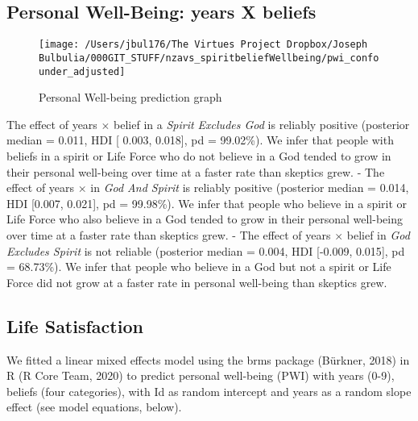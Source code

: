 \documentclass[
  english,
  man,floatsintext]{apa6}
\begin{document}
\hypertarget{personal-well-being-years-x-beliefs}{%
\subsection{Personal Well-Being: years X beliefs}\label{personal-well-being-years-x-beliefs}}

\begin{figure}
\texttt{[image: /Users/jbul176/The Virtues Project Dropbox/Joseph Bulbulia/000GIT\_STUFF/nzavs\_spiritbeliefWellbeing/pwi\_confounder\_adjusted]} \caption{Personal Well-being prediction graph}\label{fig:unnamed-chunk-2}
\end{figure}

The effect of years \(\times\) belief in a \emph{Spirit Excludes God} is reliably positive (posterior median = 0.011, HDI {[} 0.003, 0.018{]}, pd = 99.02\%). We infer that people with beliefs in a spirit or Life Force who do not believe in a God tended to grow in their personal well-being over time at a faster rate than skeptics grew.
- The effect of years \(\times\) in \emph{God And Spirit} is reliably positive (posterior median = 0.014, HDI {[}0.007, 0.021{]}, pd = 99.98\%). We infer that people who believe in a spirit or Life Force who also believe in a God tended to grow in their personal well-being over time at a faster rate than skeptics grew.
- The effect of years \(\times\) belief in \emph{God Excludes Spirit} is not reliable (posterior median = 0.004, HDI {[}-0.009, 0.015{]}, pd = 68.73\%). We infer that people who believe in a God but not a spirit or Life Force did not grow at a faster rate in personal well-being than skeptics grew.

\hypertarget{life-satisfaction-1}{%
\subsection{Life Satisfaction}\label{life-satisfaction-1}}

We fitted a linear mixed effects model using the brms package (Bürkner, 2018) in R (R Core Team, 2020) to predict personal well-being (PWI) with years (0-9), beliefs (four categories), with Id as random intercept and years as a random slope effect (see model equations, below).
\end{document}

